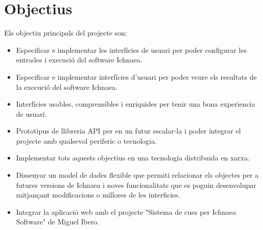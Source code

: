 \section{Objectius}
\label{sec:objetius}

Els objectiu principals del projecte son:\\

\begin{itemize}
\item Especificar e implementar les interf\'{i}cies de usuari per poder configurar les entrades i execuci\'{o} del software Ichnaea.
\item Especificar e implementar interf\'{i}cies d'usuari per poder veure els resultats de la execuci\'{o} del software Ichnaea. 
\item Interf\'{i}cies usables, comprensibles i enriquides per tenir una bona experiencia de usuari. 
\item Prototipus de llibreria API per en un futur escalar-la i poder integrar el projecte amb qualsevol periferic o tecnologia. 
\item Implementar tots aquests objectius en una tecnologia distribuida en xarxa. 
\item Dissenyar un model de dades flexible que permiti relacionar els objectes per a futures versions de Ichnaea i noves funcionalitats que es poguin desenvolupar mitjançant modificacions o millores de les interficies. 
\item Integrar la aplicaci\'{o} web amb el projecte "Sistema de cues per Ichnaea Software" de Miguel Ibero.
\end{itemize}

